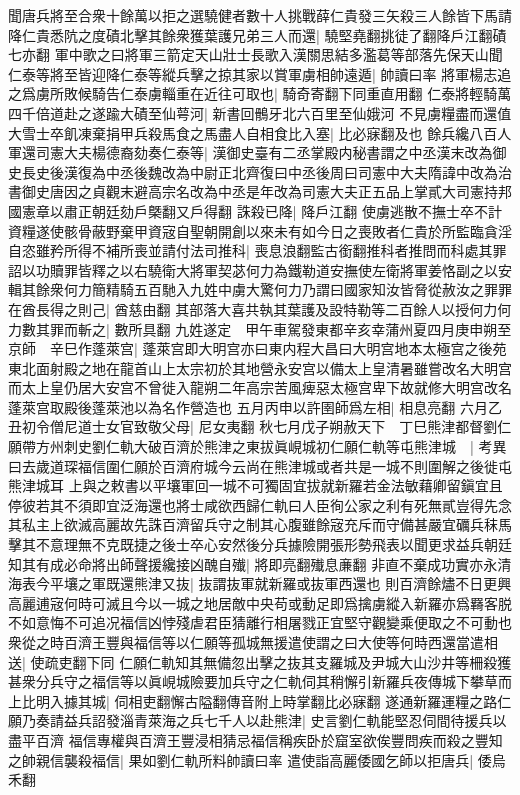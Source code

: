聞唐兵將至合衆十餘萬以拒之選驍健者數十人挑戰薛仁貴發三矢殺三人餘皆下馬請降仁貴悉阬之度磧北擊其餘衆獲葉護兄弟三人而還|{
	驍堅堯翻挑徒了翻降戶江翻磧七亦翻}
軍中歌之曰將軍三箭定天山壯士長歌入漢關思結多濫葛等部落先保天山聞仁泰等將至皆迎降仁泰等縱兵擊之掠其家以賞軍虜相帥遠遁|{
	帥讀曰率}
將軍楊志追之爲虜所敗候騎告仁泰虜輜重在近往可取也|{
	騎奇寄翻下同重直用翻}
仁泰將輕騎萬四千倍道赴之遂踰大磧至仙萼河|{
	新書回鶻牙北六百里至仙娥河}
不見虜糧盡而還值大雪士卒飢凍棄捐甲兵殺馬食之馬盡人自相食比入塞|{
	比必寐翻及也}
餘兵纔八百人軍還司憲大夫楊德裔劾奏仁泰等|{
	漢御史臺有二丞掌殿内秘書謂之中丞漢末改為御史長史後漢復為中丞後魏改為中尉正北齊復曰中丞後周曰司憲中大夫隋諱中改為治書御史唐因之貞觀末避高宗名改為中丞是年改為司憲大夫正五品上掌貳大司憲持邦國憲章以肅正朝廷劾戶槩翻又戶得翻}
誅殺已降|{
	降戶江翻}
使虜逃散不撫士卒不計資糧遂使骸骨蔽野棄甲資宼自聖朝開創以來未有如今日之喪敗者仁貴於所監臨貪淫自恣雖矜所得不補所喪並請付法司推科|{
	喪息浪翻監古銜翻推科者推問而科處其罪}
詔以功贖罪皆釋之以右驍衛大將軍契苾何力為鐵勒道安撫使左衛將軍姜恪副之以安輯其餘衆何力簡精騎五百馳入九姓中虜大驚何力乃謂曰國家知汝皆脅從赦汝之罪罪在酋長得之則己|{
	酋慈由翻}
其部落大喜共執其葉護及設特勒等二百餘人以授何力何力數其罪而斬之|{
	數所具翻}
九姓遂定　甲午車駕發東都辛亥幸蒲州夏四月庚申朔至京師　辛巳作蓬萊宫|{
	蓬萊宫即大明宫亦曰東内程大昌曰大明宫地本太極宫之後苑東北面射殿之地在龍首山上太宗初於其地營永安宫以備太上皇清暑雖嘗改名大明宫而太上皇仍居大安宫不曾徙入龍朔二年高宗苦風痺惡太極宫卑下故就修大明宫改名蓬萊宫取殿後蓬萊池以為名作營造也}
五月丙申以許圉師爲左相|{
	相息亮翻}
六月乙丑初令僧尼道士女官致敬父母|{
	尼女夷翻}
秋七月戊子朔赦天下　丁巳熊津都督劉仁願帶方州刺史劉仁軌大破百濟於熊津之東拔眞峴城初仁願仁軌等屯熊津城　|{
	考異曰去歲道琛福信圍仁願於百濟府城今云尚在熊津城或者共是一城不則圍解之後徙屯熊津城耳}
上與之敕書以平壤軍回一城不可獨固宜拔就新羅若金法敏藉卿留鎭宜且停彼若其不須即宜泛海還也將士咸欲西歸仁軌曰人臣徇公家之利有死無貳豈得先念其私主上欲滅高麗故先誅百濟留兵守之制其心腹雖餘宼充斥而守備甚嚴宜礪兵秣馬擊其不意理無不克既捷之後士卒心安然後分兵據險開張形勢飛表以聞更求益兵朝廷知其有成必命將出師聲援纔接凶醜自殱|{
	將即亮翻殱息亷翻}
非直不棄成功實亦永清海表今平壤之軍既還熊津又抜|{
	抜謂抜軍就新羅或抜軍西還也}
則百濟餘燼不日更興高麗逋宼何時可滅且今以一城之地居敵中央苟或動足即爲擒虜縱入新羅亦爲羇客脱不如意悔不可追况福信凶悖殘虐君臣猜離行相屠戮正宜堅守觀變乘便取之不可動也衆從之時百濟王豐與福信等以仁願等孤城無援遣使謂之曰大使等何時西還當遣相送|{
	使疏吏翻下同}
仁願仁軌知其無備忽出擊之抜其支羅城及尹城大山沙井等柵殺獲甚衆分兵守之福信等以眞峴城險要加兵守之仁軌伺其稍懈引新羅兵夜傳城下攀草而上比明入據其城|{
	伺相吏翻懈古隘翻傳音附上時掌翻比必寐翻}
遂通新羅運糧之路仁願乃奏請益兵詔發淄青萊海之兵七千人以赴熊津|{
	史言劉仁軌能堅忍伺間待援兵以盡平百濟}
福信專權與百濟王豐浸相猜忌福信稱疾卧於窟室欲俟豐問疾而殺之豐知之帥親信襲殺福信|{
	果如劉仁軌所料帥讀曰率}
遣使詣高麗倭國乞師以拒唐兵|{
	倭烏禾翻}


